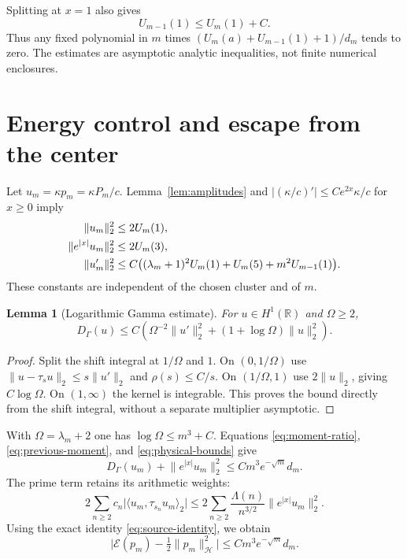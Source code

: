 \documentclass[11pt,a4paper]{article}
\newcommand{\R}{\mathbb R}
\newcommand{\HH}{\mathcal H}
\newcommand{\EE}{\mathcal E}
\newcommand{\ip}[2]{\langle #1,#2\rangle}
\newcommand{\norm}[1]{\lVert #1\rVert}
\newcommand{\abs}[1]{\lvert #1\rvert}
\newtheorem{lemma}[theorem]{Lemma}
\theoremstyle{definition}
\theoremstyle{remark}
\numberwithin{equation}{section}
\begin{document}
Splitting at $x=1$ also gives
\begin{equation}\label{eq:previous-moment}
 U_{m-1}(1)\le U_m(1)+C.
\end{equation}
Thus any fixed polynomial in $m$ times
$(U_m(a)+U_{m-1}(1)+1)/d_m$ tends to zero. The estimates are asymptotic
analytic inequalities, not finite numerical enclosures.

\section{Energy control and escape from the center}\label{sec:energy}

Let $u_m=\kappa p_m=\kappa P_m/c$. Lemma~\ref{lem:amplitudes} and
$\abs{(\kappa/c)'}\le C e^{2x}\kappa/c$ for $x\ge0$ imply
\begin{align}\label{eq:physical-bounds}
 \norm{u_m}_2^2&\le2U_m(1),\notag\\
 \norm{e^{\abs{x}}u_m}_2^2&\le2U_m(3),\notag\\
 \norm{u_m'}_2^2&\le C\bigl((\lambda_m+1)^2U_m(1)
                       +U_m(5)+m^2U_{m-1}(1)\bigr).
\end{align}
These constants are independent of the chosen cluster and of $m$.

\begin{lemma}[Logarithmic Gamma estimate]\label{lem:gamma-log}
For $u\in H^1(\R)$ and $\Omega\ge2$,
\begin{equation}\label{eq:gamma-log}
 D_\Gamma(u)\le C\left(\Omega^{-2}\norm{u'}_2^2
                   +(1+\log\Omega)\norm u_2^2\right).
\end{equation}
\end{lemma}
\begin{proof}
Split the shift integral at $1/\Omega$ and $1$. On $(0,1/\Omega)$ use
$\norm{u-\tau_su}_2\le s\norm{u'}_2$ and $\rho(s)\le C/s$.
On $(1/\Omega,1)$ use $2\norm u_2$, giving $C\log\Omega$.
On $(1,\infty)$ the kernel is integrable. This proves the bound directly
from the shift integral, without a separate multiplier asymptotic.
\end{proof}

With $\Omega=\lambda_m+2$ one has $\log\Omega\le m^3+C$. Equations
\eqref{eq:moment-ratio}, \eqref{eq:previous-moment}, and
\eqref{eq:physical-bounds} give
\begin{equation}\label{eq:physical-small}
 D_\Gamma(u_m)+\norm{e^{\abs{x}}u_m}_2^2
       \le C m^3e^{-\sqrt m}d_m.
\end{equation}
The prime term retains its arithmetic weights:
\begin{equation}\label{eq:prime-small}
 2\sum_{n\ge2}c_n\abs{\ip{u_m}{\tau_{s_n}u_m}_2}
 \le 2\sum_{n\ge2}\frac{\Lambda(n)}{n^{3/2}}
               \norm{e^{\abs{x}}u_m}_2^2.
\end{equation}
Using the exact identity \eqref{eq:source-identity}, we obtain
\begin{equation}\label{eq:unnormalized-error}
 \abs{\EE(p_m)-\tfrac12\norm{p_m}_{\HH}^2}
        \le C m^3e^{-\sqrt m}d_m.
\end{equation}
\end{document}
